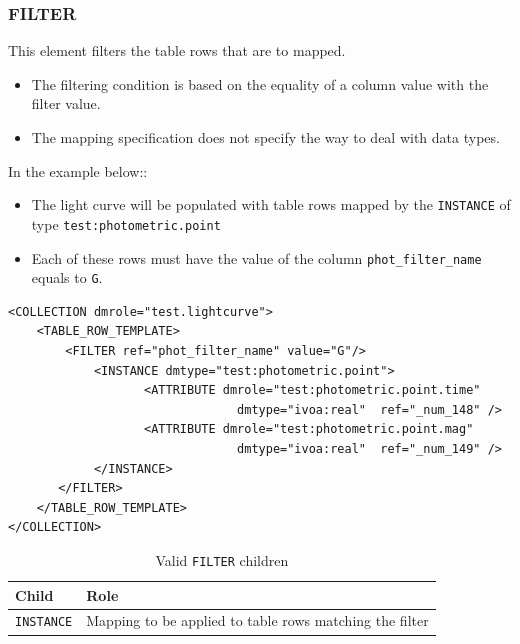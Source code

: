 \documentclass[11pt,a4paper]{ivoa}
\begin{document}
%
%

\subsubsection{FILTER}
This element filters the table rows that are to mapped. 

\begin{itemize}
   \item The filtering condition is based on the equality of a column value with the filter value.
   \item The mapping specification does not specify the way to deal with data types.
\end{itemize}

In the example below::

\begin{itemize}
   \item The light curve will be populated with table rows mapped by the \texttt{INSTANCE} of type \texttt{test:photometric.point}
   \item Each of these rows must have the value of the column \texttt{phot\_filter\_name} equals to \texttt{G}.
\end{itemize}

\begin{lstlisting}[caption={FILTER examples},style=XML]
<COLLECTION dmrole="test.lightcurve">
    <TABLE_ROW_TEMPLATE>
        <FILTER ref="phot_filter_name" value="G"/>
            <INSTANCE dmtype="test:photometric.point">
                   <ATTRIBUTE dmrole="test:photometric.point.time" 
                                dmtype="ivoa:real"  ref="_num_148" />
                   <ATTRIBUTE dmrole="test:photometric.point.mag" 
                                dmtype="ivoa:real"  ref="_num_149" />
            </INSTANCE>            
       </FILTER>
    </TABLE_ROW_TEMPLATE>
</COLLECTION>
\end{lstlisting}

\begin{table}[hbtp]
\small
\centering
\begin{tabulary}{\linewidth}{|L|J|}
       \hline  
          \textbf{Child} &  
          \textbf{Role}\\
       \hline  \hline
          \texttt{INSTANCE}    & 
          Mapping to be applied to table rows matching the filter \\       
       \hline 
     \end{tabulary}
     \caption{Valid  \texttt{FILTER} children} 
     \label{tbl:filter-children}
\end{table}
\end{document}

